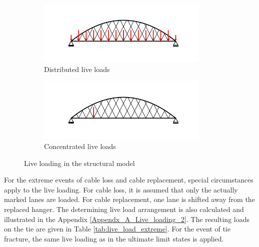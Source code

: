 
\begin{figure}[H]
\centering
\begin{subfigure}{0.5\textwidth}
    \centering
    \includegraphics[trim={0 0.8cm 0 0.8cm},clip, width=0.9\textwidth]{illustrations/figures/distributed live loads.png}
    \caption{Distributed live loads}
    \label{fig:Live_load_1}
\end{subfigure}%
\begin{subfigure}{.5\textwidth}
    \centering
    \includegraphics[trim={0 0.8cm 0 0.8cm},clip, width=0.9\textwidth]{illustrations/figures/concentrated live loads.png}
    \caption{Concentrated live loads}
    \label{fig:Live_load_2}
\end{subfigure}
\caption{Live loading in the structural model}
\label{fig:Live_load}
\end{figure}

For the extreme events of cable loss and cable replacement, special circumstances apply to the live loading. For cable loss, it is assumed that only the actually marked lanes are loaded. For cable replacement, one lane is shifted away from the replaced hanger. The determining live load arrangement is also calculated and illustrated in the Appendix \ref{Appendx_A_Live_loading_2}. The resulting loads on the tie are given in Table \ref{tab:live_load_extreme}. For the event of tie fracture, the same live loading as in the ultimate limit states is applied.

